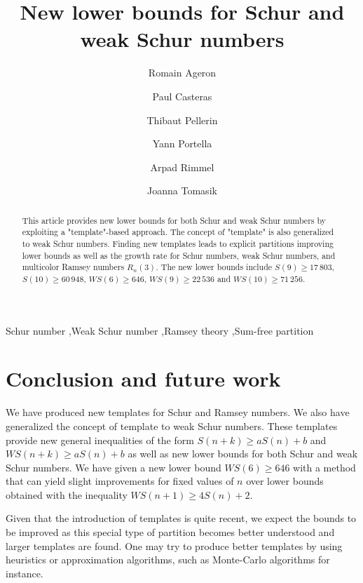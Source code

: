 \documentclass[3p]{elsarticle}
\title{New lower bounds for Schur and weak Schur numbers}
\author[1]{Romain Ageron\fnref{fn1}}
\author[1]{Paul Casteras\fnref{fn1}}
\author[1]{Thibaut Pellerin\fnref{fn1}}
\author[1]{Yann Portella\fnref{fn1}}
\author[2]{Arpad Rimmel\fnref{fn2}}
\author[2]{Joanna Tomasik\corref{cor1}\fnref{fn2}}
\newtheorem{computational theorem}[definition]{Computational Theorem}
\newcommand{\WS}{\mathit{WS}}
\begin{document}
\begin{abstract}

This article provides new lower bounds for both Schur and weak Schur numbers by exploiting a "template"-based approach. 
The concept of "template" is also generalized to weak Schur numbers. Finding new templates leads to explicit partitions 
improving lower bounds as well as the growth rate for Schur numbers, weak Schur numbers, and multicolor Ramsey numbers \(R_n(3)\). 
The new lower bounds include \(S(9) \geqslant 17\,803\), \(S(10) \geqslant 60\,948\), \(\WS(6) \geqslant 646\), 
\(\WS (9) \geqslant 22\,536\) and \(\WS (10) \geqslant 71\,256 \).

\end{abstract}

\begin{keyword}
Schur number \sep Weak Schur number \sep Ramsey theory \sep Sum-free partition
\end{keyword}

\maketitle







\section{Conclusion and future work}

We have produced new templates for Schur and Ramsey numbers. We also have generalized the concept of template to weak Schur numbers. 
These templates provide new general inequalities of the form \(S(n+k) \geqslant a S(n) + b\) and \(\WS(n+k) \geqslant a S(n) + b\) 
as well as new lower bounds for both Schur and weak Schur numbers. We have given a new lower bound \(\WS(6) \geqslant 646\) with 
a method that can yield slight improvements for fixed values of \(n\) over lower bounds obtained with the inequality 
\(\WS(n+1) \geqslant 4 S(n) + 2\).

Given that the introduction of templates is quite recent, we expect the bounds to be improved as this special type of partition 
becomes better understood and larger templates are found. One may try to produce better templates by using heuristics or 
approximation algorithms, such as Monte-Carlo algorithms for instance.
\end{document}
